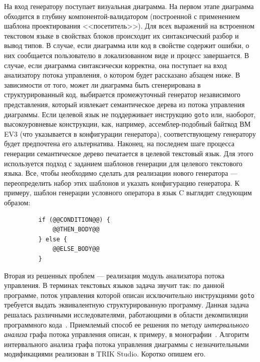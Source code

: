 \documentclass[a5paper]{article}
\begin{document}
На вход генератору поступает визуальная диаграмма. На первом этапе диаграмма обходится в глубину компонентой-валидатором (построенной с применением шаблона проектирования <<посетитель>>). Для всех выражений на встроенном текстовом языке в свойствах блоков происходит их синтаксический разбор и вывод типов. В случае, если диаграмма или код в свойстве содержит ошибки, о них сообщается пользователю в локализованном виде и процесс завершается. В случае, если диаграмма синтаксически корректна, она поступает на вход анализатору потока управления, о котором будет рассказано абзацем ниже. В зависимости от того, может ли диаграмма быть сгенерирована в структурированный код, выбирается промежуточный генератор независимого представления, который извлекает семантическое дерева из потока управления диаграммы. Если целевой язык не поддерживает инструкцию \texttt{goto} или, наоборот, высокоуровневые конструкции, как, например, ассемблер-подобный байткод ВМ EV3 (что указывается в конфигурации генератора), соответствующему генератору будет предпочтена его альтернатива. Наконец, на последнем шаге процесса генерации семантическое дерево печатается в целевой текстовый язык. Для этого используется подход с заданием шаблонов генерации для целевого текстового языка. Все, чтобы необходимо сделать для реализации нового генератора --- переопределить набор этих шаблонов и указать конфигурацию генератора. К примеру, шаблон генерации условного оператора в язык C выглядит следующим образом:

\begin{figure}[ht]
\begin{verbatim}
    if (@@CONDITION@@) {
        @@THEN_BODY@@
    } else {
        @@ELSE_BODY@@
    }
\end{verbatim}
\end{figure}

Вторая из решенных проблем --- реализация модуль анализатора потока управления. В терминах текстовых языков задача звучит так: по данной программе, поток управления которой описан исключительно инструкциями \texttt{goto} требуется выдать эквивалентную структурированную программу. Данная задача решалась различными исследователями, работающими в области декомпиляции программного кода~\cite{steven1997advanced,деревенец2009структурный}. Приемлемый способ ее решения по методу \textit{интервального анализа} графа потока управления описан, к примеру, в монографии~\cite{steven1997advanced}. Алгоритм интервального анализа графа потока управления диаграммы с незначительными модификациями реализован в TRIK Studio. Коротко опишем его.
\end{document}
